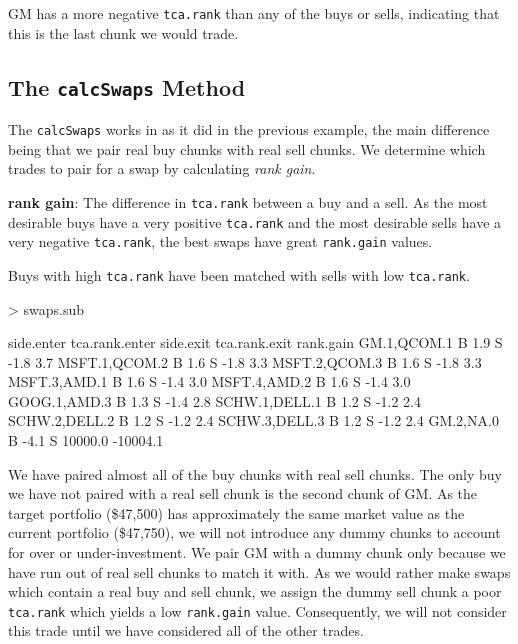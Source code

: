 \documentclass{article}
\begin{document}
GM has a more negative \texttt{tca.rank} than any of the buys or sells,
indicating that this is the last chunk we would trade.

\subsection{The \texttt{calcSwaps} Method}
\label{calcSwaps long-only}

The \texttt{calcSwaps} works in as it did in the previous example, the
main difference being that we pair real buy chunks with real sell
chunks.  We determine which trades to pair for a swap by
calculating \emph{rank gain}. 

\begin{description}

\item{\bf{rank gain}}: The difference in \texttt{tca.rank} between a
buy and a sell.  As the most desirable buys have a very positive
\texttt{tca.rank} and the most desirable sells have a very negative
\texttt{tca.rank}, the best swaps have great \texttt{rank.gain}
values.

\end{description}

Buys with high \texttt{tca.rank} have been matched with sells with low
\texttt{tca.rank}.


\begin{Schunk}
\begin{Sinput}
> swaps.sub
\end{Sinput}
\begin{Soutput}
              side.enter tca.rank.enter side.exit tca.rank.exit rank.gain
GM.1,QCOM.1            B            1.9         S          -1.8       3.7
MSFT.1,QCOM.2          B            1.6         S          -1.8       3.3
MSFT.2,QCOM.3          B            1.6         S          -1.8       3.3
MSFT.3,AMD.1           B            1.6         S          -1.4       3.0
MSFT.4,AMD.2           B            1.6         S          -1.4       3.0
GOOG.1,AMD.3           B            1.3         S          -1.4       2.8
SCHW.1,DELL.1          B            1.2         S          -1.2       2.4
SCHW.2,DELL.2          B            1.2         S          -1.2       2.4
SCHW.3,DELL.3          B            1.2         S          -1.2       2.4
GM.2,NA.0              B           -4.1         S       10000.0  -10004.1
\end{Soutput}
\end{Schunk}

We have paired almost all of the buy chunks with real sell chunks.
The only buy we have not paired with a real sell chunk is the second
chunk of GM.  As the target portfolio
(\$47,500) has approximately the same
market value as the current portfolio
(\$47,750), we will not introduce any
dummy chunks to account for over or under-investment.  We pair GM with
a dummy chunk only because we have run out of real sell chunks to
match it with.  As we would rather make swaps which contain a real buy
and sell chunk, we assign the dummy sell chunk a poor
\texttt{tca.rank} which yields a low \texttt{rank.gain} value.
Consequently, we will not consider this trade until we have considered
all of the other trades.
\end{document}
